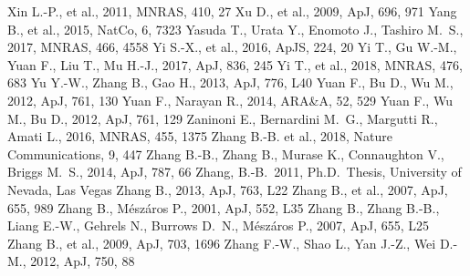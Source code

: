 \documentclass[a4paper,fleqn,usenatbib]{mnras}
\begin{document}
\begin{thebibliography}{207}
 Xin L.-P., et al., 2011, MNRAS, 410, 27
 Xu D., et al., 2009, ApJ, 696, 971
 Yang B., et al., 2015, NatCo, 6, 7323
 Yasuda T., Urata Y., Enomoto J., Tashiro M.~S., 2017, MNRAS, 466, 4558
 Yi S.-X., et al., 2016, ApJS, 224, 20
 Yi T., Gu W.-M., Yuan F., Liu T., Mu H.-J., 2017, ApJ, 836, 245
 Yi T., et al., 2018, MNRAS, 476, 683
 Yu Y.-W., Zhang B., Gao H., 2013, ApJ, 776, L40
 Yuan F., Bu D., Wu M., 2012, ApJ, 761, 130
 Yuan F., Narayan R., 2014, ARA\&A, 52, 529
 Yuan F., Wu M., Bu D., 2012, ApJ, 761, 129
 Zaninoni E., Bernardini M.~G., Margutti R., Amati L., 2016, MNRAS, 455, 1375
 Zhang B.-B. et al., 2018, Nature Communications, 9, 447
 Zhang B.-B., Zhang B., Murase K., Connaughton V., Briggs M.~S., 2014, ApJ, 787, 66
 Zhang, B.-B.\ 2011, Ph.D.~Thesis, University of Nevada, Las Vegas
 Zhang B., 2013, ApJ, 763, L22
 Zhang B., et al., 2007, ApJ, 655, 989
 Zhang B., M{\'e}sz{\'a}ros P., 2001, ApJ, 552, L35
 Zhang B., Zhang B.-B., Liang E.-W., Gehrels N., Burrows D.~N., M{\'e}sz{\'a}ros P., 2007, ApJ, 655, L25
 Zhang B., et al., 2009, ApJ, 703, 1696
 Zhang F.-W., Shao L., Yan J.-Z., Wei D.-M., 2012, ApJ, 750, 88


\end{thebibliography}

\bsp
\label{lastpage}
\end{document}
